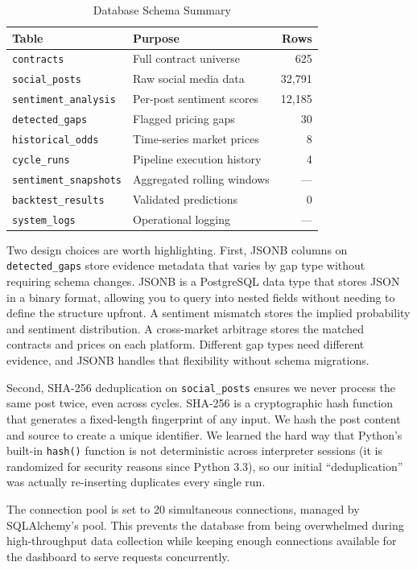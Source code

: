 \documentclass[conference]{IEEEtran}
\begin{document}
\begin{table}[H]
\centering
\caption{Database Schema Summary}
\begin{tabular}{@{}llr@{}}
\toprule
\textbf{Table} & \textbf{Purpose} & \textbf{Rows} \\
\midrule
\texttt{contracts} & Full contract universe & 625 \\
\texttt{social\_posts} & Raw social media data & 32,791 \\
\texttt{sentiment\_analysis} & Per-post sentiment scores & 12,185 \\
\texttt{detected\_gaps} & Flagged pricing gaps & 30 \\
\texttt{historical\_odds} & Time-series market prices & 8 \\
\texttt{cycle\_runs} & Pipeline execution history & 4 \\
\texttt{sentiment\_snapshots} & Aggregated rolling windows & --- \\
\texttt{backtest\_results} & Validated predictions & 0 \\
\texttt{system\_logs} & Operational logging & --- \\
\bottomrule
\end{tabular}
\label{tab:schema}
\end{table}

Two design choices are worth highlighting. First, JSONB columns on \texttt{detected\_gaps} store evidence metadata that varies by gap type without requiring schema changes. JSONB is a PostgreSQL data type that stores JSON in a binary format, allowing you to query into nested fields without needing to define the structure upfront. A sentiment mismatch stores the implied probability and sentiment distribution. A cross-market arbitrage stores the matched contracts and prices on each platform. Different gap types need different evidence, and JSONB handles that flexibility without schema migrations.

Second, SHA-256 deduplication on \texttt{social\_posts} ensures we never process the same post twice, even across cycles. SHA-256 is a cryptographic hash function that generates a fixed-length fingerprint of any input. We hash the post content and source to create a unique identifier. We learned the hard way that Python's built-in \texttt{hash()} function is not deterministic across interpreter sessions (it is randomized for security reasons since Python 3.3), so our initial ``deduplication'' was actually re-inserting duplicates every single run.

The connection pool is set to 20 simultaneous connections, managed by SQLAlchemy's pool. This prevents the database from being overwhelmed during high-throughput data collection while keeping enough connections available for the dashboard to serve requests concurrently.
\end{document}

